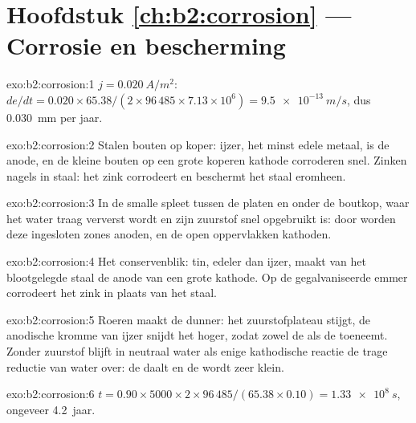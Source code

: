 \section*{Hoofdstuk \ref{ch:b2:corrosion} --- Corrosie en bescherming}

\begin{solution}{exo:b2:corrosion:1}
$j = \qty{0.020}{A/m^2}$: $de/dt = 0.020 \times 65.38/(2 \times 96\,485 \times 7.13
\times 10^6) = \qty{9.5e-13}{m/s}$, dus \qty{0.030}{mm} per jaar.
\end{solution}

\begin{solution}{exo:b2:corrosion:2}
Stalen bouten op koper: ijzer, het minst edele metaal, is de anode, en de kleine bouten
op een grote koperen kathode corroderen snel. Zinken nagels in staal: het zink corrodeert
en beschermt het staal eromheen.
\end{solution}

\begin{solution}{exo:b2:corrosion:3}
In de smalle spleet tussen de platen en onder de boutkop, waar het water
traag ververst wordt en zijn zuurstof snel opgebruikt is: door 
worden deze ingesloten zones anoden, en de open oppervlakken kathoden.
\end{solution}

\begin{solution}{exo:b2:corrosion:4}
Het conservenblik: tin, edeler dan ijzer, maakt van het blootgelegde staal de anode van een
grote kathode. Op de gegalvaniseerde emmer corrodeert het zink in plaats van het
staal.
\end{solution}

\begin{solution}{exo:b2:corrosion:5}
Roeren maakt de  dunner: het zuurstofplateau stijgt, de anodische kromme
van ijzer snijdt het hoger, zodat zowel de  als de 
toeneemt. Zonder zuurstof blijft in neutraal water als enige kathodische reactie de
trage reductie van water over: de  daalt en de
 wordt zeer klein.
\end{solution}

\begin{solution}{exo:b2:corrosion:6}
$t = 0.90 \times 5000 \times 2 \times 96\,485/(65.38 \times 0.10) = \qty{1.33e8}{s}$,
ongeveer 4.2~jaar.
\end{solution}

